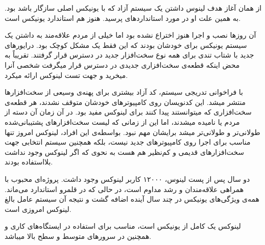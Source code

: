 از همان آغاز هدف لینوس داشتن یک سیستم آزاد که با یونیکس اصلی سازگار باشد بود. به همین علت او در مورد استانداردهای 
 پرسید.
 هنوز هم استاندارد یونیکس است.
 
آن روزها نصب و اجرا
هنوز اختراع نشده بود اما خیلی از مردم علاقه‌مند به داشتن یک سیستم یونیکس برای خودشان بودند که این فقط یک مشکل کوچک بود. درایورهای جدید با شتاب تندی برای همه نوع سخت‌افزار جدید در دسترس قرار گرفتند. تقریباً به محض اینکه قطعه‌ی سخت‌افزاری جدیدی در دسترس قرار میگرفت شخصی آنرا میخرید و جهت تست لینوکس ارائه میکرد.

با فراخوانی تدریجی سیستم، کد آزاد بیشتری برای پهنه‌ی وسیعی از سخت‌افزارها منتشر میشد. این کدنویسان روی کامپیوترهای خودشان متوقف نشدند، هر قطعه‌ی سخت‌افزاری که میتوانستند پیدا کنند برای لینوکس مفید بود.
در آن زمان آن دسته از مردم 
 یا 
 نامیده میشدند، اما این از زمانی که لیست سخت‌افزارهای پشتیبانی‌شده طولانی‌تر و طولانی‌تر میشد برایشان مهم نبود. بواسطه‌ی این افراد، لینوکس امروز تنها مناسب برای اجرا روی کامپیوترهای جدید نیست، بلکه همچنین سیستم انتخابی جهت سخت‌افزارهای قدیمی و کم‌نظیر هم هست به نحوی که اگر لینوکس وجود نداشت بلااستفاده بودند.
 
دو سال پس از پست لینوس، ۱۲۰۰۰ کاربر لینوکس وجود داشت. پروژه‌ای محبوب با همراهی علاقه‌مندان و رشد مداوم است، در حالی که در قلمرو استاندارد 
 می‌ماند. همه‌ی ویژگی‌های یونیکس در چند سال آینده اضافه گشت و نتیجه آن سیستم عامل بالغ لینوکس امروزی است.
 
 لینوکس یک 
 کامل از یونیکس است، مناسب برای استفاده در ایستگاه‌های کاری و همچنین در سرورهای متوسط و سطح بالا میباشد.

